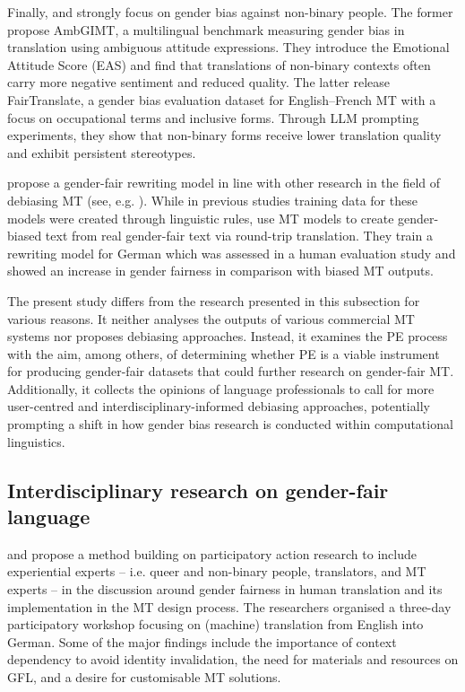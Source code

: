 Finally, \textcite{chen2024beyond} and \textcite{jourdan2025fairtranslate} strongly focus on gender bias against non-binary people. The former propose AmbGIMT, a multilingual benchmark measuring gender bias in translation using ambiguous attitude expressions. They introduce the Emotional Attitude Score (EAS) and find that translations of non-binary contexts often carry more negative sentiment and reduced quality. The latter release FairTranslate, a gender bias evaluation dataset for English–French MT with a focus on occupational terms and inclusive forms. Through LLM prompting experiments, they show that non-binary forms receive lower translation quality and exhibit persistent stereotypes.

\textcite{amrhein-etal-2023-exploiting} propose a gender-fair rewriting model in line with other research in the field of debiasing MT (see, e.g. \cite{vanmassenhove-etal-2021-neutral}). While in previous studies training data for these models were created through linguistic rules, \textcite{amrhein-etal-2023-exploiting} use MT models to create gender-biased text from real gender-fair text via round-trip translation. They train a rewriting model for German which was assessed in a human evaluation study and showed an increase in gender fairness in comparison with biased MT outputs. 

The present study differs from the research presented in this subsection for various reasons. It neither analyses the outputs of various commercial MT systems nor proposes debiasing approaches. Instead, it examines the PE process with the aim, among others, of determining whether PE is a viable instrument for producing gender-fair datasets that could further research on gender-fair MT. Additionally, it collects the opinions of language professionals to call for more user-centred and interdisciplinary-informed debiasing approaches, potentially prompting a shift in how gender bias research is conducted within computational linguistics.


\subsection{Interdisciplinary research on gender-fair language}
\textcite{burtscher-2022-genderfairmt} and \textcite{gromann2023participatory} propose a method building on participatory action research to include experiential experts -- i.e. queer and non-binary people, translators, and MT experts -- in the discussion around gender fairness in human translation and its implementation in the MT design process. The researchers organised a three-day participatory workshop focusing on (machine) translation from English into German. Some of the major findings include the importance of context dependency to avoid identity invalidation, the need for materials and resources on GFL, and a desire for customisable MT solutions.

